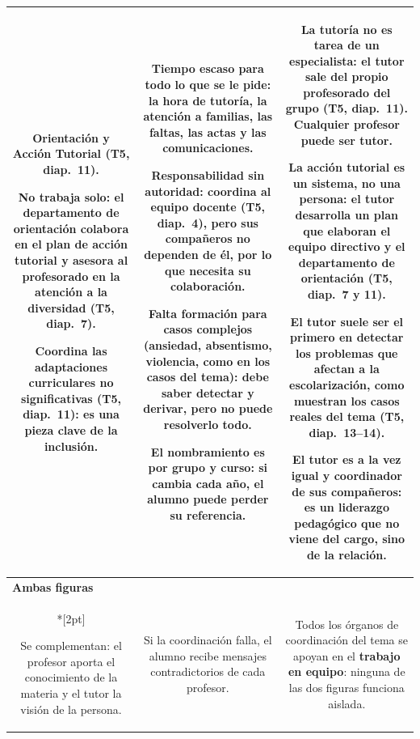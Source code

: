 \documentclass[11pt,a4paper]{article}
\newcommand{\figura}[1]{%
  \multicolumn{3}{l}{\cellcolor{acento!8}\textbf{\color{acento}#1}}\\*[2pt]}
\begin{document}
{\begin{longtable}{|C|C|C|}
\begin{pni}
  Orientación y Acción Tutorial (T5, diap.~11).
  \item \textbf{No trabaja solo}: el departamento de orientación colabora en
  el plan de acción tutorial y asesora al profesorado en la atención a la
  diversidad (T5, diap.~7).
  \item Coordina las adaptaciones curriculares no significativas (T5,
  diap.~11): es una pieza clave de la \textbf{inclusión}.
\end{pni}
&
\begin{pni}
  \item \textbf{Tiempo escaso} para todo lo que se le pide: la hora de
  tutoría, la atención a familias, las faltas, las actas y las
  comunicaciones.
  \item \textbf{Responsabilidad sin autoridad}: coordina al equipo docente
  (T5, diap.~4), pero sus compañeros no dependen de él, por lo que necesita
  su colaboración.
  \item Falta formación para \textbf{casos complejos} (ansiedad, absentismo,
  violencia, como en los casos del tema): debe saber detectar y derivar, pero
  no puede resolverlo todo.
  \item El nombramiento es por grupo y curso: si cambia cada año, el alumno
  puede perder su \textbf{referencia}.
\end{pni}
&
\begin{pni}
  \item La tutoría no es tarea de un especialista: el tutor sale del propio
  profesorado del grupo (T5, diap.~11). \textbf{Cualquier profesor puede ser
  tutor.}
  \item La acción tutorial es un \textbf{sistema}, no una persona: el tutor
  desarrolla un plan que elaboran el equipo directivo y el departamento de
  orientación (T5, diap.~7 y 11).
  \item El tutor suele ser el \textbf{primero en detectar} los problemas que
  afectan a la escolarización, como muestran los casos reales del tema (T5,
  diap.~13--14).
  \item El tutor es a la vez \textbf{igual y coordinador} de sus compañeros:
  es un liderazgo pedagógico que no viene del cargo, sino de la relación.
\end{pni}
\\ \hline
\figura{Ambas figuras}
\begin{pni}
  \item Se complementan: el profesor aporta el conocimiento de la materia y el
  tutor la visión de la persona.
\end{pni}
&
\begin{pni}
  \item Si la coordinación falla, el alumno recibe mensajes contradictorios
  de cada profesor.
\end{pni}
&
\begin{pni}
  \item Todos los órganos de coordinación del tema se apoyan en el
  \textbf{trabajo en equipo}: ninguna de las dos figuras funciona aislada.
\end{pni}
\\
\end{longtable}
}
\end{document}
